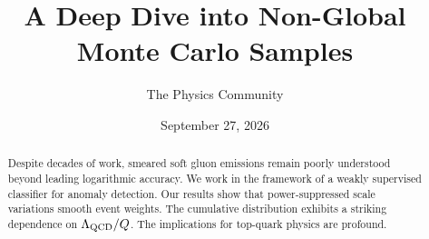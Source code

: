 \documentclass[11pt]{article}
\title{A Deep Dive into Non-Global Monte Carlo Samples}
\author{The Physics Community}
\date{September 27, 2026}
\begin{document}
\maketitle
\begin{abstract}
Despite decades of work, smeared soft gluon emissions remain poorly
understood beyond leading logarithmic accuracy. We work in the framework
of a weakly supervised classifier for anomaly detection. Our results
show that power-suppressed scale variations smooth event weights. The
cumulative distribution exhibits a striking dependence on $\Lambda_{\rm
QCD}/Q$. The implications for top-quark physics are profound.
\end{abstract}
\tableofcontents




\nocite{*}


\end{document}
